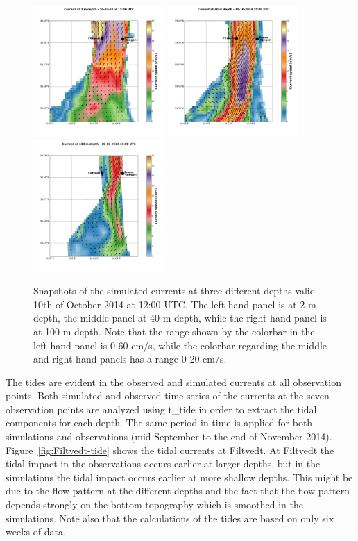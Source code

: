 \begin{figure}[ht]
\centerline{
\includegraphics*[trim=2cm 3cm 1cm 3.3cm,clip=true,height=5cm]{Figurer/Filtvedt_t4611_z2_current}
\includegraphics*[trim=3.8cm 3cm 6cm 3.3cm,clip=true,height=5cm]{Figurer/Filtvedt_t4611_z40_current}
\includegraphics*[trim=3.8cm 3cm 1cm 3.3cm,clip=true,height=5cm]{Figurer/Filtvedt_t4611_z100_current}}
\caption{\small Snapshots of the simulated currents at three different depths valid 10th of October 2014 at 12:00 UTC. The left-hand panel is at 2 m depth, the middle panel at 40 m depth, while the right-hand panel is at 100 m depth. Note that the range shown by the colorbar in the left-hand panel is 0-60 cm/s, while the colorbar  regarding the middle and right-hand panels has a range 0-20 cm/s.}
\label{fig:Filtvedt-simcur}
\end{figure}

The tides are evident in the observed and simulated currents at all observation points. Both simulated and observed time series of the currents at the seven observation points are analyzed using t\_tide \cite{pavlo:etal:2002} in order to extract the tidal components for each depth. The same period in time is applied for both simulations and observations (mid-September to the end of November 2014). Figure~\ref{fig:Filtvedt-tide} shows the tidal currents at Filtvedt. At Filtvedt the tidal impact in the observations occurs earlier at larger depths, but in the simulations the tidal impact occurs earlier at more shallow depths. This might be due to the flow pattern at the different depths and the fact that the flow pattern depends strongly on the bottom topography which is smoothed in the simulations. Note also that the calculations of the tides are based on only six weeks of data.


